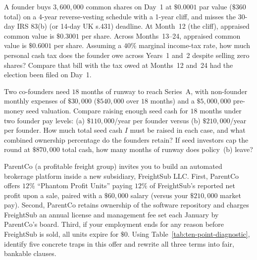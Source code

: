 \begin{exercise}
A founder buys $3{,}600{,}000$ common shares on Day~1 at $\$0.0001$ par value ($\$360$ total) on a 4-year reverse-vesting schedule with a 1-year cliff, and misses the 30-day IRS 83(b) (or 14-day UK s.431) deadline. At Month~12 (the cliff), appraised common value is $\$0.3001$ per share. Across Months~13--24, appraised common value is $\$0.6001$ per share. Assuming a $40\%$ marginal income-tax rate, how much personal cash tax does the founder owe across Years~1 and~2 despite selling zero shares? Compare that bill with the tax owed at Months~12 and~24 had the election been filed on Day~1.
\end{exercise}

\begin{exercise}
Two co-founders need $18$ months of runway to reach Series~A, with non-founder monthly expenses of $\$30{,}000$ ($\$540{,}000$ over $18$ months) and a $\$5{,}000{,}000$ pre-money seed valuation. Compare raising enough seed cash for $18$ months under two founder pay levels: (a) $\$110{,}000$/year per founder versus (b) $\$210{,}000$/year per founder. How much total seed cash $I$ must be raised in each case, and what combined ownership percentage do the founders retain? If seed investors cap the round at $\$870{,}000$ total cash, how many months of runway does policy~(b) leave?
\end{exercise}

\begin{exercise}
ParentCo (a profitable freight group) invites you to build an automated brokerage platform inside a new subsidiary, FreightSub LLC. First, ParentCo offers $12\%$ ``Phantom Profit Units'' paying $12\%$ of FreightSub's reported net profit upon a sale, paired with a $\$60{,}000$ salary (versus your $\$210{,}000$ market pay). Second, ParentCo retains ownership of the software repository and charges FreightSub an annual license and management fee set each January by ParentCo's board. Third, if your employment ends for any reason before FreightSub is sold, all units expire for $\$0$. Using Table~\ref{tab:ten-point-diagnostic}, identify five concrete traps in this offer and rewrite all three terms into fair, bankable clauses.
\end{exercise}
